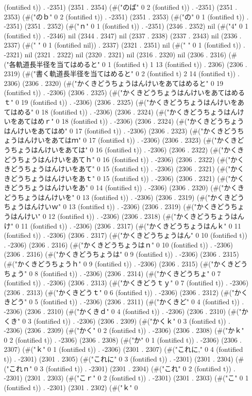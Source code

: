 (fontified t)) . -2351) (2351 . 2354) (#("のば" 0 2 (fontified t)) . -2351) (2351 . 2353) (#("のｂ" 0 2 (fontified t)) . -2351) (2351 . 2353) (#("の" 0 1 (fontified t)) . -2351) (2351 . 2352) (#("ｎ" 0 1 (fontified t)) . -2351) (2346 . 2352) nil (#("4" 0 1 (fontified t)) . -2346) nil (2344 . 2347) nil (2337 . 2338) (2337 . 2343) nil (2336 . 2337) (#(" " 0 1 (fontified nil)) . 2337) (2321 . 2351) nil (#(" " 0 1 (fontified t)) . -2321) nil (2321 . 2322) nil (2320 . 2321) nil (2316 . 2320) nil (2306 . 2316) (#("各軌道長半径を当てはめると" 0 1 (fontified t) 1 13 (fontified t)) . 2306) (2306 . 2319) (#("書く軌道長半径を当てはめると" 0 2 (fontified t) 2 14 (fontified t)) . 2306) (2306 . 2320) (#("かくきどうちょうはんけいをあてはめると" 0 19 (fontified t)) . -2306) (2306 . 2325) (#("かくきどうちょうはんけいをあてはめるｔ" 0 19 (fontified t)) . -2306) (2306 . 2325) (#("かくきどうちょうはんけいをあてはめる" 0 18 (fontified t)) . -2306) (2306 . 2324) (#("かくきどうちょうはんけいをあてはめｒ" 0 18 (fontified t)) . -2306) (2306 . 2324) (#("かくきどうちょうはんけいをあてはめ" 0 17 (fontified t)) . -2306) (2306 . 2323) (#("かくきどうちょうはんけいをあてはｍ" 0 17 (fontified t)) . -2306) (2306 . 2323) (#("かくきどうちょうはんけいをあては" 0 16 (fontified t)) . -2306) (2306 . 2322) (#("かくきどうちょうはんけいをあてｈ" 0 16 (fontified t)) . -2306) (2306 . 2322) (#("かくきどうちょうはんけいをあて" 0 15 (fontified t)) . -2306) (2306 . 2321) (#("かくきどうちょうはんけいをあｔ" 0 15 (fontified t)) . -2306) (2306 . 2321) (#("かくきどうちょうはんけいをあ" 0 14 (fontified t)) . -2306) (2306 . 2320) (#("かくきどうちょうはんけいを" 0 13 (fontified t)) . -2306) (2306 . 2319) (#("かくきどうちょうはんけいｗ" 0 13 (fontified t)) . -2306) (2306 . 2319) (#("かくきどうちょうはんけい" 0 12 (fontified t)) . -2306) (2306 . 2318) (#("かくきどうちょうはんけ" 0 11 (fontified t)) . -2306) (2306 . 2317) (#("かくきどうちょうはんｋ" 0 11 (fontified t)) . -2306) (2306 . 2317) (#("かくきどうちょうはん" 0 10 (fontified t)) . -2306) (2306 . 2316) (#("かくきどうちょうはｎ" 0 10 (fontified t)) . -2306) (2306 . 2316) (#("かくきどうちょうは" 0 9 (fontified t)) . -2306) (2306 . 2315) (#("かくきどうちょうｈ" 0 9 (fontified t)) . -2306) (2306 . 2315) (#("かくきどうちょう" 0 8 (fontified t)) . -2306) (2306 . 2314) (#("かくきどうちょ" 0 7 (fontified t)) . -2306) (2306 . 2313) (#("かくきどうｔｙ" 0 7 (fontified t)) . -2306) (2306 . 2313) (#("かくきどうｔ" 0 6 (fontified t)) . -2306) (2306 . 2312) (#("かくきどう" 0 5 (fontified t)) . -2306) (2306 . 2311) (#("かくきど" 0 4 (fontified t)) . -2306) (2306 . 2310) (#("かくきｄ" 0 4 (fontified t)) . -2306) (2306 . 2310) (#("かくき" 0 3 (fontified t)) . -2306) (2306 . 2309) (#("かくｋ" 0 3 (fontified t)) . -2306) (2306 . 2309) (#("かく" 0 2 (fontified t)) . -2306) (2306 . 2308) (#("かｋ" 0 2 (fontified t)) . -2306) (2306 . 2308) (#("か" 0 1 (fontified t)) . -2306) (2306 . 2307) (#("ｋ" 0 1 (fontified t)) . -2306) (2301 . 2307) (#("これに," 0 4 (fontified t)) . -2301) (2301 . 2305) (#("これに" 0 3 (fontified t)) . -2301) (2301 . 2304) (#("これｎ" 0 3 (fontified t)) . -2301) (2301 . 2304) (#("これ" 0 2 (fontified t)) . -2301) (2301 . 2303) (#("こｒ" 0 2 (fontified t)) . -2301) (2301 . 2303) (#("こ" 0 1 (fontified t)) . -2301) (2301 . 2302) (#("ｋ" 0 